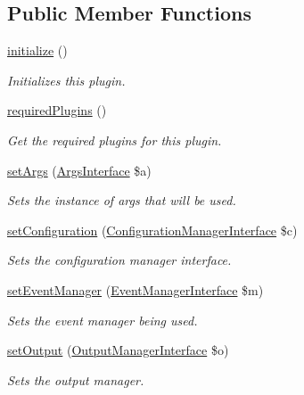 \subsection*{Public Member Functions}
\begin{DoxyCompactItemize}
\item 
\hyperlink{classDrupalSiteBuildPlugin_a42d5611c8fceef1333376cb8d2320141}{initialize} ()
\begin{DoxyCompactList}\small\item\em Initializes this plugin. \end{DoxyCompactList}\item 
\hyperlink{classDrupalSiteBuildPlugin_af140d7cfd4115b590a06684b69ab5337}{required\-Plugins} ()
\begin{DoxyCompactList}\small\item\em Get the required plugins for this plugin. \end{DoxyCompactList}\item 
\hyperlink{classGenericPlugin_abf0b12b47909ef3c4dada146ea775526}{set\-Args} (\hyperlink{interfaceArgsInterface}{Args\-Interface} \$a)
\begin{DoxyCompactList}\small\item\em Sets the instance of args that will be used. \end{DoxyCompactList}\item 
\hyperlink{classGenericPlugin_a009c5398920a9672a2f13af38756fd5f}{set\-Configuration} (\hyperlink{interfaceConfigurationManagerInterface}{Configuration\-Manager\-Interface} \$c)
\begin{DoxyCompactList}\small\item\em Sets the configuration manager interface. \end{DoxyCompactList}\item 
\hyperlink{classGenericPlugin_afc683b68f471d89aa6a95daebcbfe28a}{set\-Event\-Manager} (\hyperlink{interfaceEventManagerInterface}{Event\-Manager\-Interface} \$m)
\begin{DoxyCompactList}\small\item\em Sets the event manager being used. \end{DoxyCompactList}\item 
\hyperlink{classGenericPlugin_a00fb20d417f3ad2f9839591a84348218}{set\-Output} (\hyperlink{interfaceOutputManagerInterface}{Output\-Manager\-Interface} \$o)
\begin{DoxyCompactList}\small\item\em Sets the output manager. \end{DoxyCompactList}\item 

\end{DoxyCompactItemize}
